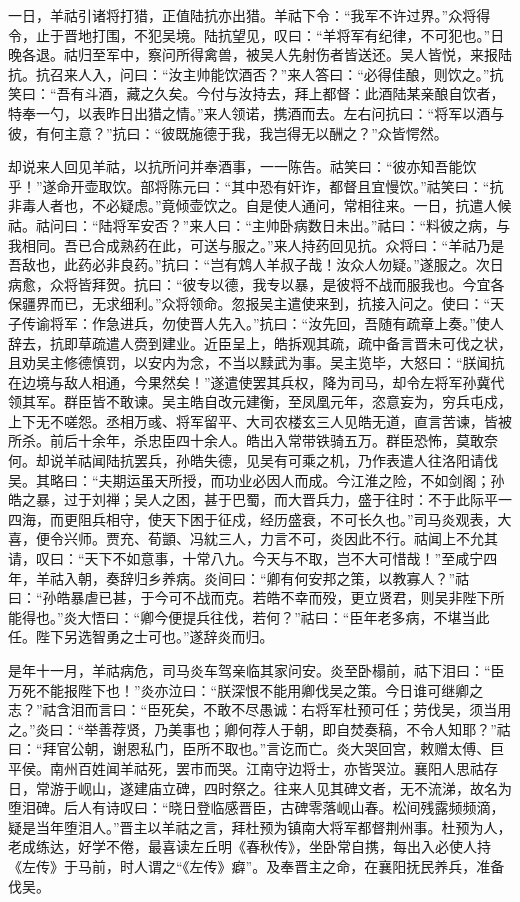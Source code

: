 一日，羊祜引诸将打猎，正值陆抗亦出猎。羊祜下令：“我军不许过界。”众将得令，止于晋地打围，不犯吴境。陆抗望见，叹曰：“羊将军有纪律，不可犯也。”日晚各退。祜归至军中，察问所得禽兽，被吴人先射伤者皆送还。吴人皆悦，来报陆抗。抗召来人入，问曰：“汝主帅能饮酒否？”来人答曰：“必得佳酿，则饮之。”抗笑曰：“吾有斗酒，藏之久矣。今付与汝持去，拜上都督：此酒陆某亲酿自饮者，特奉一勺，以表昨日出猎之情。”来人领诺，携酒而去。左右问抗曰：“将军以酒与彼，有何主意？”抗曰：“彼既施德于我，我岂得无以酬之？”众皆愕然。

却说来人回见羊祜，以抗所问并奉酒事，一一陈告。祜笑曰：“彼亦知吾能饮乎！”遂命开壶取饮。部将陈元曰：“其中恐有奸诈，都督且宜慢饮。”祜笑曰：“抗非毒人者也，不必疑虑。”竟倾壶饮之。自是使人通问，常相往来。一日，抗遣人候祜。祜问曰：“陆将军安否？”来人曰：“主帅卧病数日未出。”祜曰：“料彼之病，与我相同。吾已合成熟药在此，可送与服之。”来人持药回见抗。众将曰：“羊祜乃是吾敌也，此药必非良药。”抗曰：“岂有鸩人羊叔子哉！汝众人勿疑。”遂服之。次日病愈，众将皆拜贺。抗曰：“彼专以德，我专以暴，是彼将不战而服我也。今宜各保疆界而已，无求细利。”众将领命。忽报吴主遣使来到，抗接入问之。使曰：“天子传谕将军：作急进兵，勿使晋人先入。”抗曰：“汝先回，吾随有疏章上奏。”使人辞去，抗即草疏遣人赍到建业。近臣呈上，皓拆观其疏，疏中备言晋未可伐之状，且劝吴主修德慎罚，以安内为念，不当以黩武为事。吴主览毕，大怒曰：“朕闻抗在边境与敌人相通，今果然矣！”遂遣使罢其兵权，降为司马，却令左将军孙冀代领其军。群臣皆不敢谏。吴主皓自改元建衡，至凤凰元年，恣意妄为，穷兵屯戍，上下无不嗟怨。丞相万彧、将军留平、大司农楼玄三人见皓无道，直言苦谏，皆被所杀。前后十余年，杀忠臣四十余人。皓出入常带铁骑五万。群臣恐怖，莫敢奈何。却说羊祜闻陆抗罢兵，孙皓失德，见吴有可乘之机，乃作表遣人往洛阳请伐吴。其略曰：“夫期运虽天所授，而功业必因人而成。今江淮之险，不如剑阁；孙皓之暴，过于刘禅；吴人之困，甚于巴蜀，而大晋兵力，盛于往时：不于此际平一四海，而更阻兵相守，使天下困于征戍，经历盛衰，不可长久也。”司马炎观表，大喜，便令兴师。贾充、荀顗、冯紞三人，力言不可，炎因此不行。祜闻上不允其请，叹曰：“天下不如意事，十常八九。今天与不取，岂不大可惜哉！”至咸宁四年，羊祜入朝，奏辞归乡养病。炎间曰：“卿有何安邦之策，以教寡人？”祜曰：“孙皓暴虐已甚，于今可不战而克。若皓不幸而殁，更立贤君，则吴非陛下所能得也。”炎大悟曰：“卿今便提兵往伐，若何？”祜曰：“臣年老多病，不堪当此任。陛下另选智勇之士可也。”遂辞炎而归。

是年十一月，羊祜病危，司马炎车驾亲临其家问安。炎至卧榻前，祜下泪曰：“臣万死不能报陛下也！”炎亦泣曰：“朕深恨不能用卿伐吴之策。今日谁可继卿之志？”祜含泪而言曰：“臣死矣，不敢不尽愚诚：右将军杜预可任；劳伐吴，须当用之。”炎曰：“举善荐贤，乃美事也；卿何荐人于朝，即自焚奏稿，不令人知耶？”祜曰：“拜官公朝，谢恩私门，臣所不取也。”言讫而亡。炎大哭回宫，敕赠太傅、巨平侯。南州百姓闻羊祜死，罢市而哭。江南守边将士，亦皆哭泣。襄阳人思祜存日，常游于岘山，遂建庙立碑，四时祭之。往来人见其碑文者，无不流涕，故名为堕泪碑。后人有诗叹曰：“晓日登临感晋臣，古碑零落岘山春。松间残露频频滴，疑是当年堕泪人。”晋主以羊祜之言，拜杜预为镇南大将军都督荆州事。杜预为人，老成练达，好学不倦，最喜读左丘明《春秋传》，坐卧常自携，每出入必使人持《左传》于马前，时人谓之“《左传》癖”。及奉晋主之命，在襄阳抚民养兵，准备伐吴。


